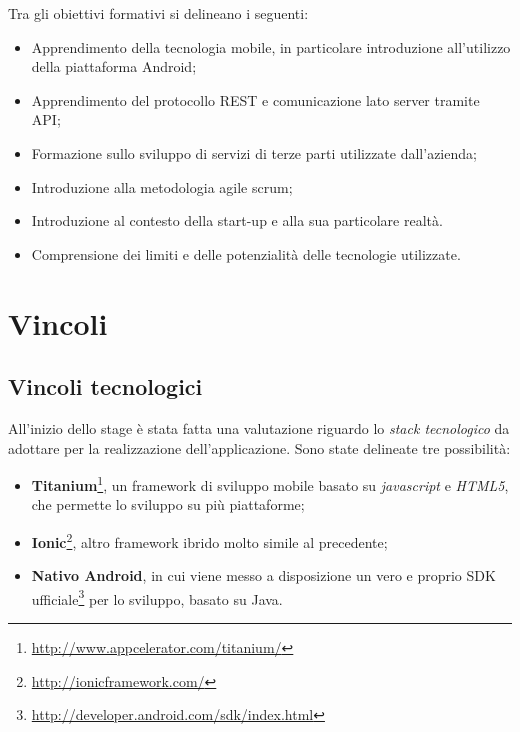 Tra gli obiettivi formativi si delineano i seguenti:

\begin{itemize}

\item Apprendimento della tecnologia mobile, in particolare introduzione all'utilizzo della piattaforma Android;
\item Apprendimento del protocollo REST e comunicazione lato server tramite API;
\item Formazione sullo sviluppo di servizi di terze parti utilizzate dall'azienda; 
\item Introduzione alla metodologia agile scrum;
\item Introduzione al contesto della start-up e alla sua particolare realtà.
\item Comprensione dei limiti e delle potenzialità delle tecnologie utilizzate.

\end{itemize}

\section{Vincoli}

\subsection{Vincoli tecnologici}

All'inizio dello stage è stata fatta una valutazione riguardo lo \textit{stack tecnologico} da adottare per la realizzazione dell'applicazione. Sono state delineate tre possibilità:

\begin{itemize}

\item \textbf{Titanium}\footnote{\url{http://www.appcelerator.com/titanium/}}, un framework di sviluppo mobile basato su \textit{javascript} e \textit{HTML5}, che permette lo sviluppo su più piattaforme;

\item \textbf{Ionic}\footnote{\url{http://ionicframework.com/}}, altro framework ibrido molto simile al precedente;

\item \textbf{Nativo Android}, in cui viene messo a disposizione un vero e proprio SDK ufficiale\footnote{\url{http://developer.android.com/sdk/index.html}} per lo sviluppo, basato su Java.

\end{itemize}

